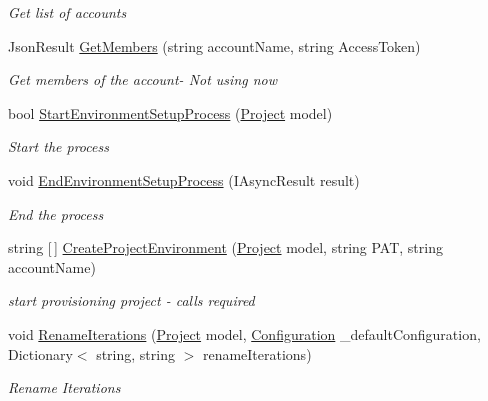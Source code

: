 \begin{DoxyCompactItemize}
\begin{DoxyCompactList}\small\item\em Get list of accounts \end{DoxyCompactList}\item 
Json\+Result \mbox{\hyperlink{class_vsts_demo_builder_1_1_controllers_1_1_environment_controller_a1a7a16aa8a18f17e1fafb079e5ec5de4}{Get\+Members}} (string account\+Name, string Access\+Token)
\begin{DoxyCompactList}\small\item\em Get members of the account-\/ Not using now \end{DoxyCompactList}\item 
bool \mbox{\hyperlink{class_vsts_demo_builder_1_1_controllers_1_1_environment_controller_ad6b69ff448fc483cb517729d55c55dcc}{Start\+Environment\+Setup\+Process}} (\mbox{\hyperlink{class_vsts_demo_builder_1_1_models_1_1_project}{Project}} model)
\begin{DoxyCompactList}\small\item\em Start the process \end{DoxyCompactList}\item 
void \mbox{\hyperlink{class_vsts_demo_builder_1_1_controllers_1_1_environment_controller_ada15b3cbf0e3c37b0c9e0036b45671c2}{End\+Environment\+Setup\+Process}} (I\+Async\+Result result)
\begin{DoxyCompactList}\small\item\em End the process \end{DoxyCompactList}\item 
string \mbox{[}$\,$\mbox{]} \mbox{\hyperlink{class_vsts_demo_builder_1_1_controllers_1_1_environment_controller_a78d06b5fc70004a4b23a10a22670b04e}{Create\+Project\+Environment}} (\mbox{\hyperlink{class_vsts_demo_builder_1_1_models_1_1_project}{Project}} model, string P\+AT, string account\+Name)
\begin{DoxyCompactList}\small\item\em start provisioning project -\/ calls required \end{DoxyCompactList}\item 
void \mbox{\hyperlink{class_vsts_demo_builder_1_1_controllers_1_1_environment_controller_a990cb5c0fd92cee0d4926b92a5951436}{Rename\+Iterations}} (\mbox{\hyperlink{class_vsts_demo_builder_1_1_models_1_1_project}{Project}} model, \mbox{\hyperlink{class_vsts_demo_builder_1_1_models_1_1_configuration}{Configuration}} \+\_\+default\+Configuration, Dictionary$<$ string, string $>$ rename\+Iterations)
\begin{DoxyCompactList}\small\item\em Rename Iterations \end{DoxyCompactList}\item 

\end{DoxyCompactItemize}

